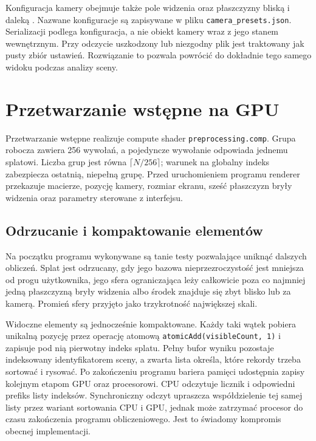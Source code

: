 Konfiguracja kamery obejmuje także pole widzenia oraz płaszczyzny bliską  i daleką . Nazwane konfiguracje są zapisywane w pliku \texttt{camera\_presets.json}. Serializacji podlega konfiguracja, a nie obiekt kamery wraz z jego stanem wewnętrznym. Przy odczycie uszkodzony lub niezgodny plik jest traktowany jak pusty zbiór ustawień. Rozwiązanie to pozwala powrócić do dokładnie tego samego widoku podczas analizy sceny.
\section{Przetwarzanie wstępne na GPU}
\label{sec:impl_preprocessing}

Przetwarzanie wstępne realizuje compute shader
\texttt{preprocessing.comp}. Grupa robocza zawiera 256 wywołań, a pojedyncze
wywołanie odpowiada jednemu splatowi. Liczba grup jest równa
$\lceil N/256\rceil$; warunek na globalny indeks zabezpiecza ostatnią,
niepełną grupę. Przed uruchomieniem programu renderer przekazuje macierze,
pozycję kamery, rozmiar ekranu, sześć płaszczyzn bryły widzenia oraz parametry
sterowane z interfejsu.

\subsection{Odrzucanie i kompaktowanie elementów}
\label{subsec:impl_culling}

Na początku programu wykonywane są tanie testy pozwalające uniknąć dalszych obliczeń. Splat jest odrzucany, gdy jego bazowa nieprzezroczystość jest mniejsza od progu użytkownika, jego sfera ograniczająca leży całkowicie poza co najmniej jedną płaszczyzną bryły widzenia albo środek znajduje się zbyt blisko lub za kamerą. Promień sfery przyjęto jako trzykrotność największej skali.

Widoczne elementy są jednocześnie kompaktowane. Każdy taki wątek pobiera unikalną pozycję przez operację atomową \texttt{atomicAdd(visibleCount, 1)} i zapisuje pod nią pierwotny indeks splatu. Pełny bufor wyniku pozostaje indeksowany identyfikatorem sceny, a zwarta lista określa, które rekordy trzeba sortować i rysować. Po zakończeniu programu bariera pamięci udostępnia zapisy kolejnym etapom GPU oraz procesorowi. CPU odczytuje licznik i odpowiedni prefiks listy indeksów. Synchroniczny odczyt upraszcza współdzielenie tej samej listy przez wariant sortowania CPU i GPU, jednak może zatrzymać procesor do czasu zakończenia programu obliczeniowego. Jest to świadomy kompromis obecnej implementacji.

